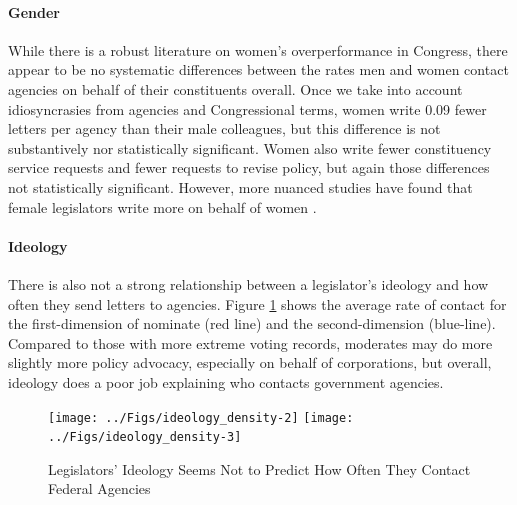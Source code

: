 \documentclass{article}
\begin{document}



\paragraph{Gender} While there is a robust literature on women's overperformance in Congress, there appear to be no systematic differences between the rates men and women contact agencies on behalf of their constituents overall.  Once we take into account idiosyncrasies from agencies and Congressional terms, women write 0.09 fewer letters per agency than their male colleagues, but this difference is not substantively nor statistically significant.  Women also write fewer constituency service requests and fewer requests to revise policy, but again those differences not statistically significant.  However, more nuanced studies have found that female legislators write more on behalf of women \citet{LowandeRitchieLauterbach2018}. 

\paragraph{Ideology} There is also not a strong relationship between a legislator's ideology and how often they send letters to agencies.  Figure \ref{f:fig1} shows the average rate of contact for the first-dimension of nominate (red line) and the second-dimension (blue-line).  Compared to those with more extreme voting records, moderates may do more slightly more policy advocacy, especially on behalf of corporations, but overall, ideology does a poor job explaining who contacts government agencies.  


\begin{figure}
\centering
\caption{Legislators' Ideology Seems Not to Predict How Often They Contact Federal Agencies}\label{f:fig1}
\texttt{[image: ../Figs/ideology\_density-2]}
\texttt{[image: ../Figs/ideology\_density-3]}
\end{figure}



\end{document}
